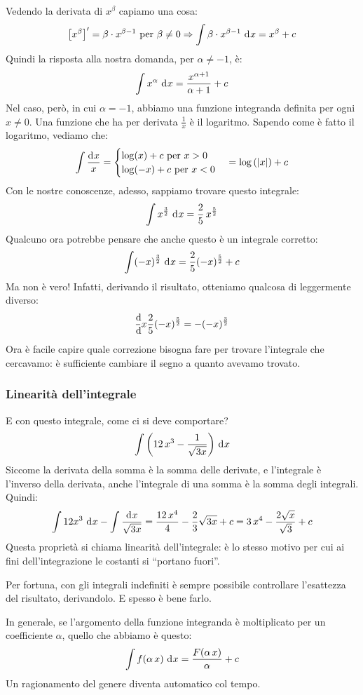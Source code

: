 Vedendo la derivata di $x^{\beta}$ capiamo una cosa:
\[
\left[ x^{\beta} \right]' = \beta \cdot x^{\beta - 1} \text{ per } \beta \neq 0 \implies
\int \beta \cdot x^{\beta - 1} \dx = x^{\beta} + c
\]
Quindi la risposta alla nostra domanda, per $\alpha \neq -1$, \`e:
\[
\int x^{\alpha} \dx = \frac{x^{\alpha + 1}}{\alpha + 1} + c
\]
Nel caso, per\`o, in cui $\alpha = -1$, abbiamo una funzione integranda definita per ogni $x \neq 0$. Una funzione che ha per derivata $\frac{1}{x}$ \`e il logaritmo. Sapendo come \`e fatto il logaritmo, vediamo che:
\[
\int \frac{\diff x}{x} =
\begin{cases}
\log (x) + c \text{ per } x > 0 \\
\log (-x) + c \text{ per } x < 0
\end{cases}
= \abslog{x} + c
\]
Con le nostre conoscenze, adesso, sappiamo trovare questo integrale:
\[
\int x^{\frac{3}{2}} \dx = \frac{2}{5} \, x^{\frac{5}{2}}
\]
Qualcuno ora potrebbe pensare che anche questo \`e un integrale corretto:
\[
\int (- x)^{\frac{3}{2}} \dx = \frac{2}{5} (- x)^{\frac{5}{2}} + c
\]
Ma non \`e vero! Infatti, derivando il risultato, otteniamo qualcosa di leggermente diverso:
\[
\deriv{x} \frac{2}{5} (- x)^{\frac{5}{2}} = - (-x)^{\frac{3}{2}}
\]
Ora \`e facile capire quale correzione bisogna fare per trovare l'integrale che cercavamo: \`e sufficiente cambiare il segno a quanto avevamo trovato.

\subsubsection{Linearit\`a dell'integrale}

E con questo integrale, come ci si deve comportare?
\[
\int \left( 12 \, x^3 - \frac{1}{\sqrt{3x}} \right) \dx
\]
Siccome la derivata della somma \`e la somma delle derivate, e l'integrale \`e l'inverso della derivata, anche l'integrale di una somma \`e la somma degli integrali. Quindi:
\[
\int 12 x^3 \dx - \int \frac{\diff x}{\sqrt{3x}} = 
\frac{12 \, x^4}{4} - \frac{2}{3} \sqrt{3x} + c =
3 \, x^4 - \frac{2 \sqrt{x}}{\sqrt{3}} + c
\]
Questa propriet\`a si chiama linearit\`a dell'integrale: \`e lo stesso motivo per cui ai fini dell'integrazione le costanti si ``portano fuori''.

Per fortuna, con gli integrali indefiniti \`e sempre possibile controllare l'esattezza del risultato, derivandolo. E spesso \`e bene farlo.

In generale, se l'argomento della funzione integranda \`e moltiplicato per un coefficiente $\alpha$, quello che abbiamo \`e questo:
\[
\int f(\alpha \, x) \dx = \frac{F(\alpha \, x)}{\alpha} + c
\]
Un ragionamento del genere diventa automatico col tempo.

